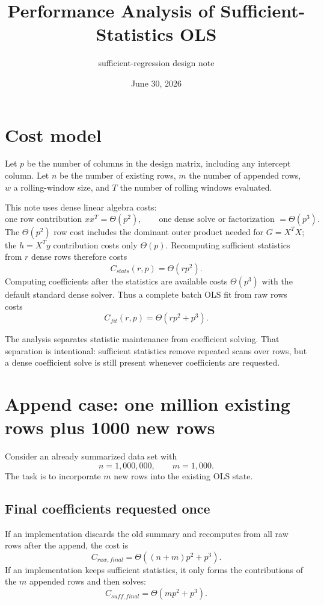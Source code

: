 \documentclass[11pt]{article}
\title{Performance Analysis of Sufficient-Statistics OLS}
\author{sufficient-regression design note}
\date{June 30, 2026}
\begin{document}
\maketitle

\section{Cost model}

Let \(p\) be the number of columns in the design matrix, including any
intercept column.  Let \(n\) be the number of existing rows, \(m\) the
number of appended rows, \(w\) a rolling-window size, and \(T\) the
number of rolling windows evaluated.

This note uses dense linear algebra costs:
\[
  \text{one row contribution } xx^T = \Theta(p^2),
  \qquad
  \text{one dense solve or factorization } = \Theta(p^3).
\]
The \(\Theta(p^2)\) row cost includes the dominant outer product
needed for \(G=X^T X\); the \(h=X^T y\) contribution costs only
\(\Theta(p)\).  Recomputing sufficient statistics from \(r\) dense rows
therefore costs
\[
  C_{stats}(r,p)=\Theta(rp^2).
\]
Computing coefficients after the statistics are available costs
\(\Theta(p^3)\) with the default standard dense solver.  Thus a complete
batch OLS fit from raw rows costs
\[
  C_{fit}(r,p)=\Theta(rp^2+p^3).
\]

The analysis separates statistic maintenance from coefficient solving.
That separation is intentional: sufficient statistics remove repeated
scans over rows, but a dense coefficient solve is still present whenever
coefficients are requested.

\section{Append case: one million existing rows plus 1000 new rows}

Consider an already summarized data set with
\[
  n=1{,}000{,}000,\qquad m=1{,}000 .
\]
The task is to incorporate \(m\) new rows into the existing OLS state.

\subsection{Final coefficients requested once}

If an implementation discards the old summary and recomputes from all
raw rows after the append, the cost is
\[
  C_{raw,final}
  =
  \Theta((n+m)p^2+p^3).
\]
If an implementation keeps sufficient statistics, it only forms the
contributions of the \(m\) appended rows and then solves:
\[
  C_{suff,final}
  =
  \Theta(mp^2+p^3).
\]
\end{document}

